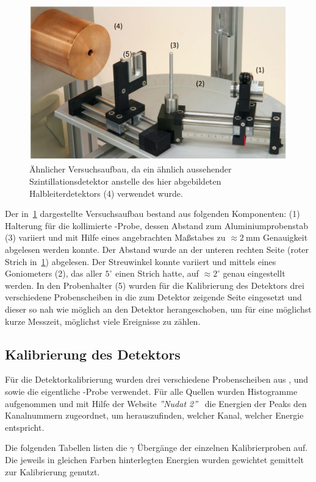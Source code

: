 \documentclass[slug=CS, room=Andreas-Schubert-Bau\,\ Labor\ 406,
supervisor=Juliane\ Volkmer, coursedate=29.\ 11.\ 2019]{../../Lab_Report_LaTeX/lab_report}
\newcommand{\am}{\ce{^241Am} }
\begin{document}
\begin{figure}[H]\centering
        \includegraphics[width=.7\columnwidth]{./pictures/versuchsaufbau.png}
        \caption{Ähnlicher Versuchsaufbau, da ein ähnlich aussehender Szintillationsdetektor anstelle
                des hier abgebildeten Halbleiterdetektors (4) verwendet wurde.}
        \label{fig:versuchsaufbau}
\end{figure}

Der in~\ref{fig:versuchsaufbau} dargestellte Versuchsaufbau bestand aus folgenden Komponenten:
(1) Halterung für die kollimierte \am{}-Probe, dessen Abstand zum Aluminiumprobenstab (3)
variiert und mit Hilfe eines angebrachten Maßstabes zu \(\approx \SI{2}{\milli\metre}\)
Genauigkeit abgelesen werden konnte. Der Abstand wurde an der unteren rechten Seite (roter Strich
in~\ref{fig:versuchsaufbau}) abgelesen. Der Streuwinkel konnte variiert und mittels eines
Goniometers (2), das aller \(5^\circ\) einen Strich hatte, auf \(\approx 2^\circ\) genau
eingestellt werden. In den Probenhalter (5) wurden für die Kalibrierung des Detektors drei
verschiedene Probenscheiben in die zum Detektor zeigende Seite eingesetzt und dieser so nah wie
möglich an den Detektor herangeschoben, um für eine möglichst kurze Messzeit, möglichst viele Ereignisse zu zählen.

\subsection{Kalibrierung des Detektors}
\label{sec:kalib}

Für die Detektorkalibrierung wurden drei verschiedene Probenscheiben aus ,
 und  sowie die eigentliche \am{}-Probe verwendet.
Für alle Quellen wurden Histogramme aufgenommen und mit Hilfe der Website \emph{''Nudat 2''}~\cite{nudat}
die Energien der Peaks den Kanalnummern zugeordnet, um herauszufinden, welcher Kanal, welcher
Energie entspricht.

Die folgenden Tabellen listen die \(\gamma\) \"Uberg\"ange der
einzelnen Kalibrierproben auf. Die jeweils in gleichen Farben
hinterlegten Energien wurden gewichtet gemittelt zur Kalibrierung genutzt.
\end{document}
